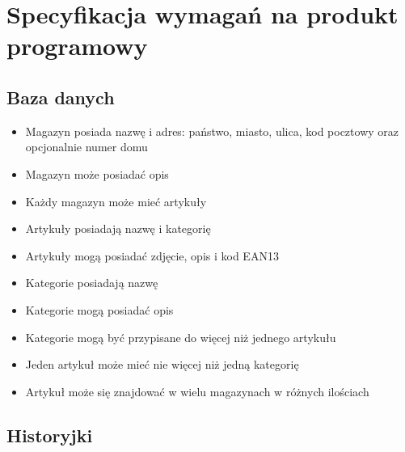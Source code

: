 \documentclass[../main.tex]{subfiles}
\begin{document}
\section{Specyfikacja wymagań na produkt programowy}
    \subsection{Baza danych}
        \begin{itemize}
            \item Magazyn posiada nazwę i adres: państwo, miasto, ulica, kod pocztowy oraz opcjonalnie numer domu 
            \item Magazyn może posiadać opis 
            \item Każdy magazyn może mieć artykuły
            \item Artykuły posiadają nazwę i kategorię
            \item Artykuły mogą posiadać zdjęcie, opis i kod EAN13
            \item Kategorie posiadają nazwę
            \item Kategorie mogą posiadać opis
            \item Kategorie mogą być przypisane do więcej niż jednego artykułu
            \item Jeden artykuł może mieć nie więcej niż jedną kategorię
            \item Artykuł może się znajdować w wielu magazynach w różnych ilościach
        \end{itemize}
    \subsection{Historyjki}
\end{document}
